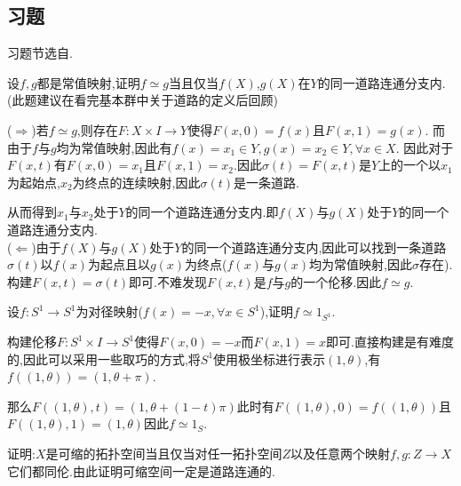 \documentclass{article}
\begin{document}
\subsection{习题}
习题节选自\cite{周建伟2007代数拓扑讲义}.
\begin{exercise}
设$f,g$都是常值映射,证明$f \simeq g$当且仅当$f(X)$,$g(X)$在$Y$的同一道路连通分支内.(此题建议在看完基本群中关于道路的定义后回顾)
\end{exercise}
\begin{solution}
    ($\Rightarrow$)若$f \simeq g$,则存在$F : X \times I \to Y$使得$F(x,0) = f(x)$且$F(x,1) = g(x)$.
    而由于$f$与$g$均为常值映射,因此有$f(x) = x_1 \in Y,g(x) = x_2 \in Y,\forall x \in X$.
    因此对于$F(x,t)$有$F(x,0) = x_1$且$F(x,1) = x_2$.因此$\sigma(t) = F(x,t)$是$Y$上的一个以$x_1$为起始点,$x_2$为终点的连续映射,因此$\sigma(t)$是一条道路.


    从而得到$x_1$与$x_2$处于$Y$的同一个道路连通分支内.即$f(X)$与$g(X)$处于$Y$的同一个道路连通分支内.\\
    ($\Leftarrow$)由于$f(X)$与$g(X)$处于$Y$的同一个道路连通分支内,因此可以找到一条道路$\sigma(t)$以$f(x)$为起点且以$g(x)$为终点($f(x)$与$g(x)$均为常值映射,因此$\sigma$存在).构建$F(x,t) = \sigma(t)$即可.不难发现$F(x,t)$是$f$与$g$的一个伦移.因此$f \simeq g$.
\end{solution}
\begin{exercise}
    设$f: S^1 \to S^1$为对径映射($f(x) = -x,\forall x\in S^1$),证明$f \simeq 1_{S^1}$.
\end{exercise}
\begin{solution}
    构建伦移$F : S^1 \times I \to S^1$使得$F(x,0) = -x$而$F(x,1) = x$即可.直接构建是有难度的,因此可以采用一些取巧的方式,将$S^1$使用极坐标进行表示$(1,\theta)$,有$f((1,\theta)) = (1,\theta+\pi)$.


    那么$F((1,\theta),t) = (1,\theta+(1-t)\pi)$此时有$F((1,\theta),0) = f((1,\theta))$且$F((1,\theta),1) = (1,\theta)$因此$f \simeq 1_S$.
\end{solution}
\begin{exercise}
    证明:$X$是可缩的拓扑空间当且仅当对任一拓扑空间$Z$以及任意两个映射$f,g : Z \to X$它们都同伦.由此证明可缩空间一定是道路连通的.
\end{exercise}
\end{document}
